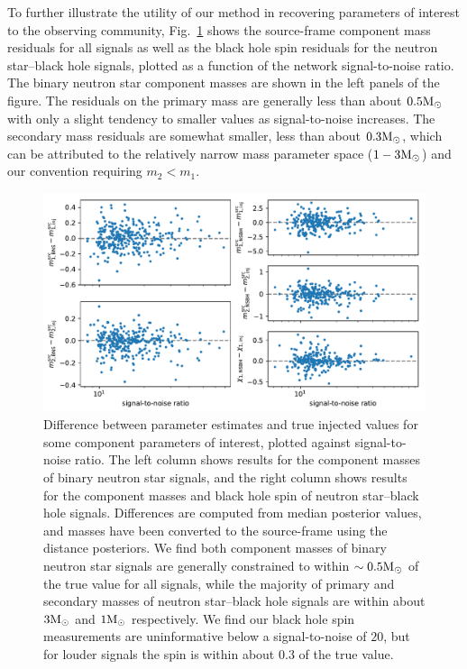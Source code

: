 To further illustrate the utility of our method in recovering parameters of interest to the observing community, Fig.~\ref{fig:component_recovery} shows the source-frame component mass residuals for all signals as well as the black hole spin residuals for the neutron star--black hole signals, plotted as a function of the network signal-to-noise ratio. The binary neutron star component masses are shown in the left panels of the figure. The residuals on the primary mass are generally less than about $0.5\mathrm{M}_{\odot}$ with only a slight tendency to smaller values as signal-to-noise increases. The secondary mass residuals are somewhat smaller, less than about $0.3\mathrm{M}_{\odot}$, which can be attributed to the relatively narrow mass parameter space ($1-3\mathrm{M}_{\odot}$) and our convention requiring $m_{2}<m_{1}$.

\begin{figure}[ht]
\includegraphics[width=\textwidth]{Figures/rel-bin-pe/component_residuals_src_frame_2col.pdf}
\caption{Difference between parameter estimates and true injected values for some component parameters of interest, plotted against signal-to-noise ratio. The left column shows results for the component masses of binary neutron star signals, and the right column shows results for the component masses and black hole spin of neutron star--black hole signals. Differences are computed from median posterior values, and masses have been converted to the source-frame using the distance posteriors. We find both component masses of binary neutron star signals are generally constrained to within $\sim 0.5\mathrm{M}_{\odot}$ of the true value for all signals, while the majority of primary and secondary masses of neutron star--black hole signals are within about $3\mathrm{M}_{\odot}$ and $1\mathrm{M}_{\odot}$ respectively. We find our black hole spin measurements are uninformative below a signal-to-noise of $20$, but for louder signals the spin is within about $0.3$ of the true value.}
\label{fig:component_recovery}
\end{figure}

